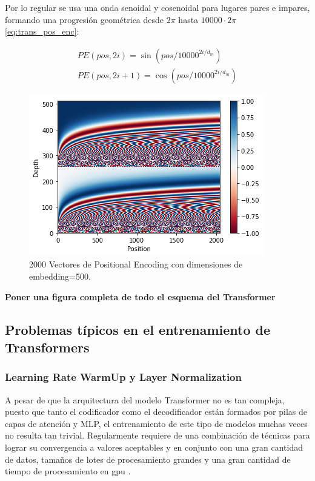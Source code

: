 Por lo regular se usa una onda senoidal y cosenoidal para lugares pares e impares, formando una progresión
geométrica desde $2\pi$ hasta $10000 \cdot 2\pi$ \ref{eq:trans_pos_enc}:

\begin{equation}
    \begin{split}
        PE(pos, 2i) = \sin(pos/10000^{2i/d_m})\\
        PE(pos, 2i+1) = \cos(pos/10000^{2i/d_m})
    \end{split}
    \label{eq:trans_pos_enc}
\end{equation}


\begin{figure}[ht!]
    \centering
    \includegraphics[width=0.5 \textwidth]{Chapters/2. Transformer/Figures/transformer/pos_enc.png}
    \caption{2000 Vectores de Positional Encoding con dimensiones de embedding=500.}
    \label{fig:trans_pos_enc}
\end{figure}

\textbf{Poner una figura completa de todo el esquema del Transformer}

\subsection{Problemas típicos en el entrenamiento de Transformers}

\subsubsection{Learning Rate WarmUp y Layer Normalization}

A pesar de que la arquitectura del modelo Transformer no es tan compleja, puesto que tanto el
codificador como el decodificador están formados por pilas de capas de atención y MLP, el
entrenamiento de este tipo de modelos muchas veces no resulta tan trivial. Regularmente requiere de
una combinación de técnicas para lograr su convergencia a valores aceptables y en conjunto con una
gran cantidad de datos, tamaños de lotes de procesamiento grandes y una gran cantidad de tiempo
de procesamiento en gpu \cite{DBLP:journals/corr/abs-1804-00247}.

